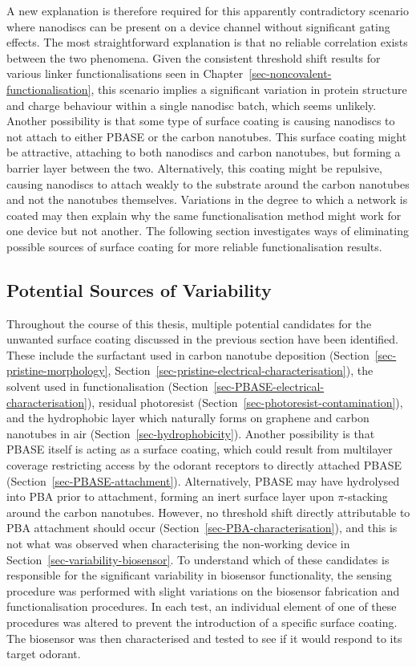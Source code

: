 \documentclass[
  a4paper,
]{scrbook}
\begin{document}
A new explanation is therefore required for this apparently
contradictory scenario where nanodiscs can be present on a device
channel without significant gating effects. The most straightforward
explanation is that no reliable correlation exists between the two
phenomena. Given the consistent threshold shift results for various
linker functionalisations seen in
Chapter~\ref{sec-noncovalent-functionalisation}, this scenario implies a
significant variation in protein structure and charge behaviour within a
single nanodisc batch, which seems unlikely. Another possibility is that
some type of surface coating is causing nanodiscs to not attach to
either PBASE or the carbon nanotubes. This surface coating might be
attractive, attaching to both nanodiscs and carbon nanotubes, but
forming a barrier layer between the two. Alternatively, this coating
might be repulsive, causing nanodiscs to attach weakly to the substrate
around the carbon nanotubes and not the nanotubes themselves. Variations
in the degree to which a network is coated may then explain why the same
functionalisation method might work for one device but not another. The
following section investigates ways of eliminating possible sources of
surface coating for more reliable functionalisation results.

\hypertarget{sec-contamination}{%
\subsection{Potential Sources of Variability}\label{sec-contamination}}

Throughout the course of this thesis, multiple potential candidates for
the unwanted surface coating discussed in the previous section have been
identified. These include the surfactant used in carbon nanotube
deposition (Section~\ref{sec-pristine-morphology},
Section~\ref{sec-pristine-electrical-characterisation}), the solvent
used in functionalisation
(Section~\ref{sec-PBASE-electrical-characterisation}), residual
photoresist (Section~\ref{sec-photoresist-contamination}), and the
hydrophobic layer which naturally forms on graphene and carbon nanotubes
in air (Section~\ref{sec-hydrophobicity}). Another possibility is that
PBASE itself is acting as a surface coating, which could result from
multilayer coverage restricting access by the odorant receptors to
directly attached PBASE (Section~\ref{sec-PBASE-attachment}).
Alternatively, PBASE may have hydrolysed into PBA prior to attachment,
forming an inert surface layer upon \(\pi\)-stacking around the carbon
nanotubes. However, no threshold shift directly attributable to PBA
attachment should occur (Section~\ref{sec-PBA-characterisation}), and
this is not what was observed when characterising the non-working device
in Section~\ref{sec-variability-biosensor}. To understand which of these
candidates is responsible for the significant variability in biosensor
functionality, the sensing procedure was performed with slight
variations on the biosensor fabrication and functionalisation
procedures. In each test, an individual element of one of these
procedures was altered to prevent the introduction of a specific surface
coating. The biosensor was then characterised and tested to see if it
would respond to its target odorant.
\end{document}
